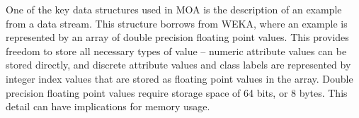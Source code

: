     One of the key data structures used in MOA is the description of an example
from a data stream. This structure borrows from WEKA, where an example is
represented by an array of double precision floating point values. This provides
freedom to store all necessary types of value \--- numeric attribute values can be
stored directly, and discrete attribute values and class labels are represented
by integer index values that are stored as floating point values in the array.
Double precision floating point values require storage space of 64 bits, or 8
bytes. This detail can have implications for memory usage. %
\ENDOMIT